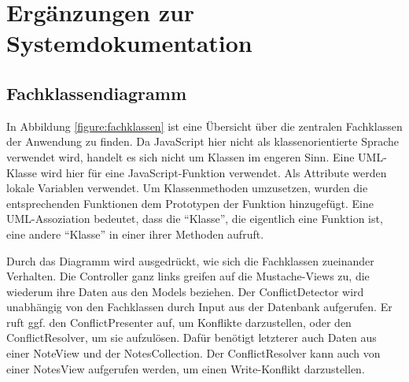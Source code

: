 \section{Ergänzungen zur Systemdokumentation}

\subsection{Fachklassendiagramm}
\label{subsec:fachklassendiagramm}

In Abbildung \ref{figure:fachklassen} ist eine Übersicht über die zentralen Fachklassen der Anwendung zu finden. Da JavaScript hier nicht als klassenorientierte Sprache verwendet wird, handelt es sich nicht um Klassen im engeren Sinn. Eine UML-Klasse wird hier für eine JavaScript-Funktion verwendet. Als Attribute werden lokale Variablen verwendet. Um Klassenmethoden umzusetzen, wurden die entsprechenden Funktionen dem Prototypen der Funktion hinzugefügt. Eine UML-Assoziation bedeutet, dass die \enquote{Klasse}, die eigentlich eine Funktion ist, eine andere \enquote{Klasse} in einer ihrer Methoden aufruft.

Durch das Diagramm wird ausgedrückt, wie sich die Fachklassen zueinander Verhalten. Die Controller ganz links greifen auf die Mustache-Views zu, die wiederum ihre Daten aus den Models beziehen. Der {\selectfont ConflictDetector} wird unabhängig von den Fachklassen durch Input aus der Datenbank aufgerufen. Er ruft ggf. den {\selectfont ConflictPresenter} auf, um Konflikte darzustellen, oder den {\selectfont ConflictResolver}, um sie aufzulösen. Dafür benötigt letzterer auch Daten aus einer {\selectfont NoteView} und der {\selectfont NotesCollection}. Der {\selectfont ConflictResolver} kann auch von einer {\selectfont NotesView} aufgerufen werden, um einen Write-Konflikt darzustellen. 

